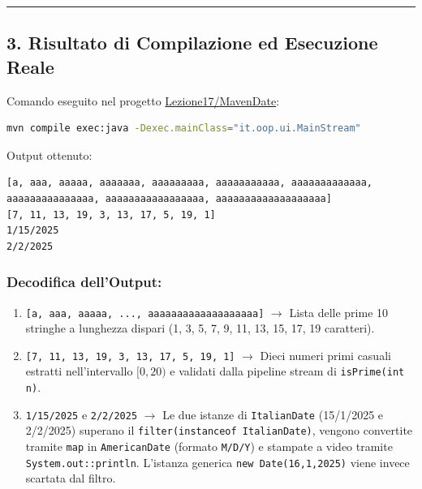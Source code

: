 \documentclass[11pt,a4paper]{article}
\newcommand{\passthrough}[1]{#1}
\providecommand{\tightlist}{\setlength{\itemsep}{0pt}\setlength{\parskip}{0pt}}
\begin{document}
\begin{center}\rule{0.5\linewidth}{0.5pt}\end{center}

\subsection{3. Risultato di Compilazione ed Esecuzione
Reale}\label{risultato-di-compilazione-ed-esecuzione-reale}

Comando eseguito nel progetto
\href{file:///home/wally/Documenti/GitHub/Programmazione-II/25-26/Teoria-e-Esercitazioni/Codice-20260902/Lezione17/MavenDate}{Lezione17/MavenDate}:

\begin{lstlisting}[language=bash]
mvn compile exec:java -Dexec.mainClass="it.oop.ui.MainStream"
\end{lstlisting}

Output ottenuto:

\begin{lstlisting}
[a, aaa, aaaaa, aaaaaaa, aaaaaaaaa, aaaaaaaaaaa, aaaaaaaaaaaaa, aaaaaaaaaaaaaaa, aaaaaaaaaaaaaaaaa, aaaaaaaaaaaaaaaaaaa]
[7, 11, 13, 19, 3, 13, 17, 5, 19, 1]
1/15/2025
2/2/2025
\end{lstlisting}

\subsubsection{Decodifica dell'Output:}\label{decodifica-delloutput}

\begin{enumerate}
\def\labelenumi{\arabic{enumi}.}
\tightlist
\item
  \passthrough{\lstinline![a, aaa, aaaaa, ..., aaaaaaaaaaaaaaaaaaa]!}
  \(\rightarrow\) Lista delle prime 10 stringhe a lunghezza dispari (1,
  3, 5, 7, 9, 11, 13, 15, 17, 19 caratteri).
\item
  \passthrough{\lstinline![7, 11, 13, 19, 3, 13, 17, 5, 19, 1]!}
  \(\rightarrow\) Dieci numeri primi casuali estratti nell'intervallo
  \([0, 20)\) e validati dalla pipeline stream di
  \passthrough{\lstinline!isPrime(int n)!}.
\item
  \passthrough{\lstinline!1/15/2025!} e
  \passthrough{\lstinline!2/2/2025!} \(\rightarrow\) Le due istanze di
  \passthrough{\lstinline!ItalianDate!} (15/1/2025 e 2/2/2025) superano
  il \passthrough{\lstinline!filter(instanceof ItalianDate)!}, vengono
  convertite tramite \passthrough{\lstinline!map!} in
  \passthrough{\lstinline!AmericanDate!} (formato
  \passthrough{\lstinline!M/D/Y!}) e stampate a video tramite
  \passthrough{\lstinline!System.out::println!}. L'istanza generica
  \passthrough{\lstinline!new Date(16,1,2025)!} viene invece scartata
  dal filtro.
\end{enumerate}
\end{document}
